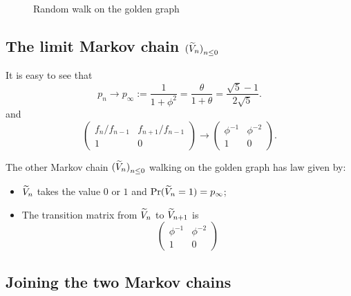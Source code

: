 \documentclass[12pt,a4paper]{article}
\begin{document}
\begin{figure}[!h]
   \centering
{}
   \caption{Random walk on the golden graph}
   \label{fig:Golden}
 \end{figure}


\subsection{The limit Markov chain ${(\widetilde{V}_n)}_{n \leq 0}$}

It is easy to see that 
$$
p_n \to p_\infty := \frac{1}{1+\phi^2}= \frac{\theta}{1+\theta} = \frac{\sqrt{5}-1}{2\sqrt{5}}.
$$
and 
$$
\begin{pmatrix}
f_n/f_{n-1} & f_{n+1}/f_{n-1} \\
1 & 0
\end{pmatrix} 
\to \begin{pmatrix}
\phi^{-1} & \phi^{-2} \\
1 & 0
\end{pmatrix}. 
$$

The other Markov chain ${(\widetilde{V}_n)}_{n \leq 0}$ walking on the golden graph has law given by:

\begin{itemize}
\item $\widetilde{V}_n$ takes the value $0$ or $1$ and $\Pr(\widetilde{V}_n=1) = p_\infty$;

\item The transition matrix from $\widetilde{V}_{n}$ to $\widetilde{V}_{n+1}$ is 
$$
\begin{pmatrix}
\phi^{-1} & \phi^{-2} \\
1 & 0
\end{pmatrix}
$$
\end{itemize}


\subsection{Joining the two Markov chains}
\end{document}
